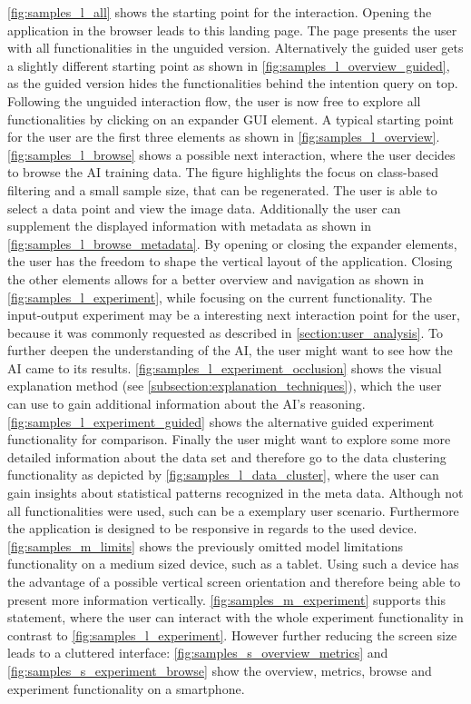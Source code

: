 \documentclass[11pt,a4paper,english]{scrreprt}
\begin{document}
\autoref{fig:samples_l_all} shows the starting point for the interaction. Opening the application in the browser leads to this landing page. The page presents the user with all functionalities in the unguided version. Alternatively the guided user gets a slightly different starting point as shown in \autoref{fig:samples_l_overview_guided}, as the guided version hides the functionalities behind the intention query on top. Following the unguided interaction flow, the user is now free to explore all functionalities by clicking on an expander GUI element. A typical starting point for the user are the first three elements as shown in \autoref{fig:samples_l_overview}. \autoref{fig:samples_l_browse} shows a possible next interaction, where the user decides to browse the AI training data. The figure highlights the focus on class-based filtering and a small sample size, that can be regenerated. The user is able to select a data point and view the image data. Additionally the user can supplement the displayed information with metadata as shown in \autoref{fig:samples_l_browse_metadata}. By opening or closing the expander elements, the user has the freedom to shape the vertical layout of the application. Closing the other elements allows for a better overview and navigation as shown in \autoref{fig:samples_l_experiment}, while focusing on the current functionality. The input-output experiment may be a interesting next interaction point for the user, because it was commonly requested as described in \autoref{section:user_analysis}. To further deepen the understanding of the AI, the user might want to see how the AI came to its results. \autoref{fig:samples_l_experiment_occlusion} shows the visual explanation method (see \autoref{subsection:explanation_techniques}), which the user can use to gain additional information about the AI's reasoning. \autoref{fig:samples_l_experiment_guided} shows the alternative guided experiment functionality for comparison. Finally the user might want to explore some more detailed information about the data set and therefore go to the data clustering functionality as depicted by \autoref{fig:samples_l_data_cluster}, where the user can gain insights about statistical patterns recognized in the meta data. Although not all functionalities were used, such can be a exemplary user scenario. Furthermore the application is designed to be responsive in regards to the used device. \autoref{fig:samples_m_limits} shows the previously omitted model limitations functionality on a medium sized device, such as a tablet. Using such a device has the advantage of a possible vertical screen orientation and therefore being able to present more information vertically. \autoref{fig:samples_m_experiment} supports this statement, where the user can interact with the whole experiment functionality in contrast to \autoref{fig:samples_l_experiment}. However further reducing the screen size leads to a cluttered interface: \autoref{fig:samples_s_overview_metrics} and \autoref{fig:samples_s_experiment_browse} show the overview, metrics, browse and experiment functionality on a smartphone.
\end{document}

